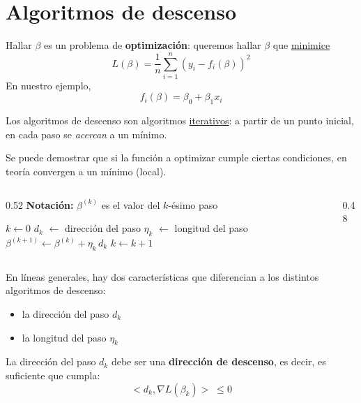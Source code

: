 \documentclass[aspectratio=169, usenames,dvipsnames]{beamer}
\begin{document}
\section{Algoritmos de descenso}

\begin{frame}
    Hallar $\beta$ es un problema de \textbf{optimización}: queremos hallar $\beta$ que \underline{minimice}
    \[L(\beta) = \dfrac{1}{n} \sum_{i=1}^n (y_i - f_i(\beta))^2\]
    \pause
    En nuestro ejemplo, 
    \[f_i(\beta) = \beta_0 + \beta_1x_i\]
\end{frame}

\begin{frame}
    Los algoritmos de descenso son algoritmos \underline{iterativos}: a partir de un punto inicial, en cada paso se \textit{acercan} a un mínimo.
    \vspace{0.5cm}
    
    Se puede demostrar que si la función a optimizar cumple ciertas condiciones, en teoría convergen a un mínimo (local).
\end{frame}

\begin{frame}[fragile]
    \begin{columns}
    \begin{column}{0.52\textwidth}
    \textbf{Notación:} $\beta^{(k)}$ es el valor del $k$-ésimo paso
    \vspace{0.1cm}
    
    \begin{algorithm}[H]
        \DontPrintSemicolon
    	$k \leftarrow 0$\;
     	{
      		$d_k$ $\leftarrow$ dirección del paso\;
            $\eta_k$ $\leftarrow$ longitud del paso\;
            $\beta^{(k+1)} \leftarrow \beta^{(k)} + \eta_k\,d_k$ \;
            $k \leftarrow k+1$
      	}
    \end{algorithm}
    \end{column}
    \begin{column}{0.48\textwidth}
        
    \end{column}
    \end{columns}
\end{frame}

\begin{frame}
    En líneas generales, hay dos características que diferencian a los distintos algoritmos de descenso:
    \begin{itemize}
        \item la dirección del paso $d_k$
        \item la longitud del paso $\eta_k$
    \end{itemize}

    \pause
    \vspace{0.5cm}
    La dirección del paso $d_k$ debe ser una \textbf{dirección de descenso}, es decir, es suficiente que cumpla:
    \[<d_k, \nabla L(\beta_k)>\; \leq 0 \]
\end{frame}
\end{document}
